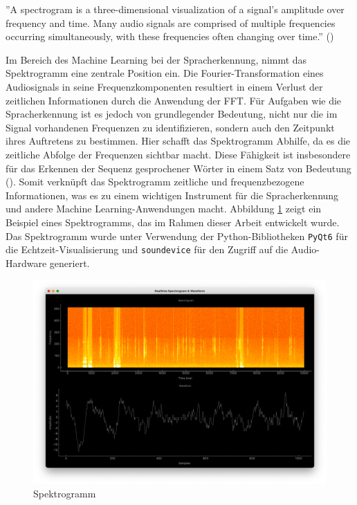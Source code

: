 \documentclass[11pt,a4paper]{article}
\begin{document}
\begin{displayquote}
	''A spectrogram is a three-dimensional visualization of a signal’s amplitude over frequency and
	time. Many audio signals are comprised of multiple frequencies occurring simultaneously, with
	these frequencies often changing over time.'' (\cite[Chapter~15.2.1]{tarr2018hackaudio})
\end{displayquote}

\noindent
Im Bereich des Machine Learning bei der Spracherkennung, nimmt das Spektrogramm eine
zentrale Position ein. Die Fourier-Transformation eines Audiosignals in seine Frequenzkomponenten
resultiert in einem Verlust der zeitlichen Informationen durch die Anwendung der FFT. Für Aufgaben
wie die Spracherkennung ist es jedoch von grundlegender Bedeutung, nicht nur die im Signal
vorhandenen Frequenzen zu identifizieren, sondern auch den Zeitpunkt ihres Auftretens zu bestimmen.
Hier schafft das Spektrogramm Abhilfe, da es die zeitliche Abfolge der Frequenzen sichtbar macht.
Diese Fähigkeit ist insbesondere für das Erkennen der Sequenz gesprochener Wörter in einem Satz von
Bedeutung (\cite{chaudhary2020}). Somit verknüpft das Spektrogramm zeitliche und frequenzbezogene
Informationen, was es zu einem wichtigen Instrument für die Spracherkennung und andere Machine
Learning-Anwendungen macht. Abbildung \ref{fig:spectrogram} zeigt ein Beispiel eines Spektrogramms,
das im Rahmen dieser Arbeit entwickelt wurde. Das Spektrogramm wurde unter Verwendung der
Python-Bibliotheken \texttt{PyQt6} für die Echtzeit-Visualisierung und \texttt{soundevice} für den
Zugriff auf die Audio-Hardware generiert.

\begin{figure}[H]
	\centering
	\includegraphics[width=0.73\linewidth]{img/spectrogram.png}
	\caption{Spektrogramm}
	\label{fig:spectrogram}
\end{figure}
\end{document}
